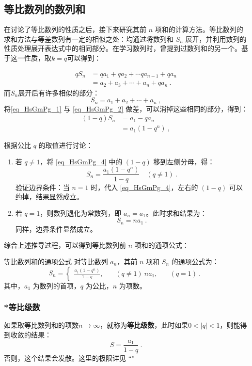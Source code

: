 \subsection{等比数列的数列和}

在讨论了等比数列的性质之后，接下来研究其前 $n$ 项和的计算方法。等比数列的求和方法与等差数列有一定的相似之处：均通过将数列和 $S_n$ 展开，并利用数列的性质处理展开表达式中的相同部分。在学习数列时，曾提到过数列和的另一个。基于这一性质，取$k=q$可以得到：

\begin{equation}\label{eq_HsGmPg_1}
\begin{aligned}
qS_n &= qa_1 + qa_2 + \cdots qa_{n-1}+ qa_n\\
&=a_2 + a_3 + \cdots + a_n+qa_n~.
\end{aligned}
\end{equation}
而$S_n$展开后有许多相似的部分：
\begin{equation}\label{eq_HsGmPg_2}
S_n = a_1 + a_2 + \cdots + a_n~,
\end{equation}
将\autoref{eq_HsGmPg_1} 与 \autoref{eq_HsGmPg_2} 做差，可以消掉这些相同的部分，得到：
\begin{equation}\label{eq_HsGmPg_4}
\begin{aligned}
(1 - q)S_n &= a_1 - qa_n\\
&= a_1(1 - q^n)~,
\end{aligned}
\end{equation}

根据公比 $q$ 的取值进行讨论：
\begin{enumerate}
\item 若 $q \neq 1$，将 \autoref{eq_HsGmPg_4} 中的 $(1 - q)$ 移到左侧分母，得：
\begin{equation}
S_n = \frac{a_1(1 - q^n)}{1 - q} \quad (q \neq 1)~.
\end{equation}
验证边界条件：当 $n = 1$ 时，代入 \autoref{eq_HsGmPg_4}，左右的 $(1 - q)$ 可以约掉，结果显然成立。
\item 若 $q = 1$，则数列退化为常数列，即 $a_n = a_1$。此时求和结果为：
\begin{equation}
S_n = na_1~.
\end{equation}
同样，边界条件显然成立。
\end{enumerate}

综合上述推导过程，可以得到等比数列前 $n$ 项和的通项公式：
\begin{corollary}{等比数列和的通项公式}
对等比数列 ${a_n}$，其前 $n$ 项和 $S_n$ 的通项公式为：
\begin{equation}
S_n = \begin{cases}
\displaystyle\frac{a_1(1 - q^n)}{1 - q}, & \quad (q \neq 1) \
na_1, & \quad (q = 1)~.
\end{cases}
\end{equation}
其中，$a_1$ 为数列的首项，$q$ 为公比，$n$ 为项数。
\end{corollary}

\subsubsection{*等比级数}

如果取等比数列和的项数$n\rightarrow \infty$，就称为\textbf{等比级数}，此时如果$0<|q|<1$，则能得到收敛的结果：
\begin{equation}
S = \frac{a_1}{1 - q}~.
\end{equation}
否则，这个结果会发散。这里的极限详见 “”